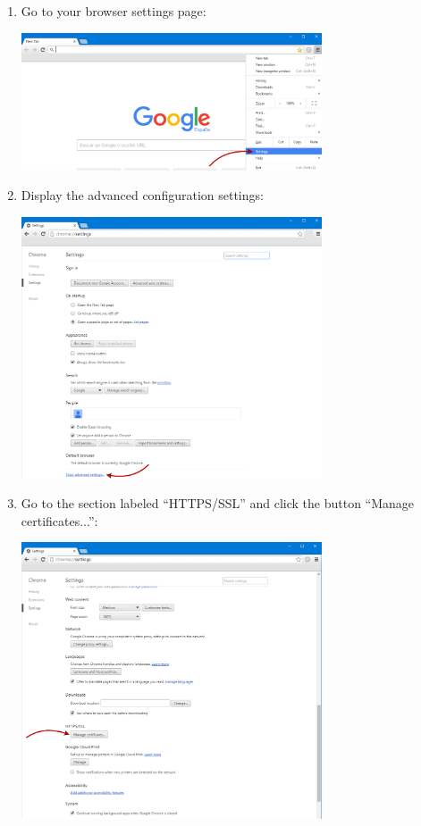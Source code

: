\documentclass[a4paper,10pt]{article}
\begin{document}
\begin{enumerate}
	\item Go to your browser settings page:\\
	\begin{center}\includegraphics[width=0.7\textwidth]{InstallCert01.png}\end{center}
	
	\item Display the advanced configuration settings:\\
	\begin{center}\includegraphics[width=0.7\textwidth]{InstallCert02.png}\end{center}
	
	\item Go to the section labeled ``HTTPS/SSL'' and click the button ``Manage certificates...'':\\
	\begin{center}\includegraphics[width=0.7\textwidth]{InstallCert03.png}\end{center}
	

\end{enumerate}
\end{document}
